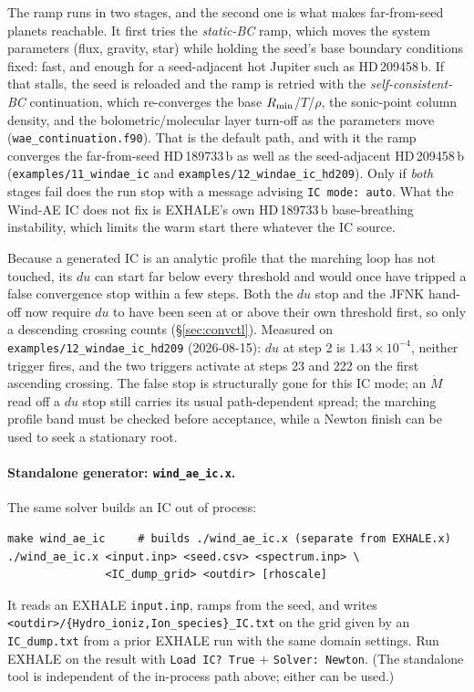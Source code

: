 \documentclass[english,a4paper]{my_memo}
\begin{document}
The ramp runs in two stages, and the second one is what makes far-from-seed
planets reachable. It first tries the \emph{static-BC} ramp, which moves the
system parameters (flux, gravity, star) while holding the seed's base boundary
conditions fixed: fast, and enough for a seed-adjacent hot Jupiter such as
HD\,209458\,b. If that stalls, the seed is reloaded and the ramp is retried
with the \emph{self-consistent-BC} continuation, which re-converges the base
$R_{\rm min}$/$T$/$\rho$, the sonic-point column density, and the
bolometric/molecular layer turn-off as the parameters move
(\texttt{wae\_continuation.f90}). That is the default path, and with it the
ramp converges the far-from-seed HD\,189733\,b as well as the seed-adjacent
HD\,209458\,b (\texttt{examples/11\_windae\_ic} and
\texttt{examples/12\_windae\_ic\_hd209}). Only if \emph{both} stages fail does
the run stop with a message advising \texttt{IC mode: auto}. What the Wind-AE
IC does not fix is EXHALE's own HD\,189733\,b base-breathing instability, which
limits the warm start there whatever the IC source.

Because a generated IC is an analytic profile that the marching loop has not
touched, its $du$ can start far below every threshold and would once have
tripped a false convergence stop within a few steps. Both the $du$ stop and the
JFNK hand-off now require $du$ to have been seen at or above their own
threshold first, so only a descending crossing counts (\S\ref{sec:convctl}).
Measured on \texttt{examples/12\_windae\_ic\_hd209} (2026-08-15): $du$ at step 2
is $1.43\times10^{-4}$, neither trigger fires, and the two triggers activate at steps 23 and
222 on the first ascending crossing. The false stop is structurally gone for
this IC mode; an $\dot M$ read off a $du$ stop still carries its usual
path-dependent spread; the marching profile band must be checked before
acceptance, while a Newton finish can be used to seek a stationary root.

\paragraph{Standalone generator: \texttt{wind\_ae\_ic.x}.}
The same solver builds an IC out of process:
\begin{lstlisting}[style=sh]
make wind_ae_ic     # builds ./wind_ae_ic.x (separate from EXHALE.x)
./wind_ae_ic.x <input.inp> <seed.csv> <spectrum.inp> \
               <IC_dump_grid> <outdir> [rhoscale]
\end{lstlisting}
It reads an EXHALE \texttt{input.inp}, ramps from the seed, and writes
\texttt{<outdir>/\{Hydro\_ioniz,Ion\_species\}\_IC.txt} on the grid given by
an \texttt{IC\_dump.txt} from a prior EXHALE run with the same domain
settings. Run EXHALE on the result with \texttt{Load IC?\ True}
$+$ \texttt{Solver: Newton}. (The standalone tool is independent of the
in-process path above; either can be used.)
\end{document}
